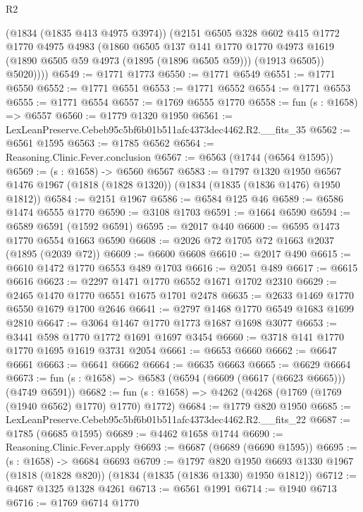 \begin{lexlean}{R2}
\begin{coremodule}
          (@1834 (@1835 @413 @4975 @3974))
          (@2151
            @6505
            @328
            @602
            @415
            @1772
            @1770
            @4975
            @4983
            (@1860
              @6505
              @137
              @141
              @1770
              @1770
              @4973
              @1619
              (@1890 @6505 @59 @4973 (@1895 (@1896 @6505 @59)))
              (@1913 @6505))
            @5020))))
@6549 := @1771 @1773
@6550 := @1771 @6549
@6551 := @1771 @6550
@6552 := @1771 @6551
@6553 := @1771 @6552
@6554 := @1771 @6553
@6555 := @1771 @6554
@6557 := @1769 @6555 @1770
@6558 := fun (s : @1658) => @6557
@6560 := @1779 @1320 @1950
@6561 := LexLeanPreserve.Cebeb95c5bf6b01b511afc4373dec4462.R2.__fits_35
@6562 := @6561 @1595
@6563 := @1785 @6562
@6564 := Reasoning.Clinic.Fever.conclusion
@6567 := @6563 (@1744 (@6564 @1595))
@6569 := (s : @1658) -> @6560 @6567
@6583 := @1797
    @1320
    @1950
    @6567
    @1476
    @1967
    (@1818 (@1828 @1320))
    (@1834 (@1835 (@1836 @1476) @1950 @1812))
@6584 := @2151 @1967
@6586 := @6584 @125 @46
@6589 := @6586 @1474 @6555 @1770
@6590 := @3108 @1703
@6591 := @1664 @6590
@6594 := @6589 @6591 (@1592 @6591)
@6595 := @2017 @440
@6600 := @6595 @1473 @1770 @6554 @1663 @6590
@6608 := @2026 @72 @1705 @72 @1663 @2037 (@1895 (@2039 @72))
@6609 := @6600 @6608
@6610 := @2017 @490
@6615 := @6610 @1472 @1770 @6553 @489 @1703
@6616 := @2051 @489
@6617 := @6615 @6616
@6623 := @2297 @1471 @1770 @6552 @1671 @1702 @2310
@6629 := @2465 @1470 @1770 @6551 @1675 @1701 @2478
@6635 := @2633 @1469 @1770 @6550 @1679 @1700 @2646
@6641 := @2797 @1468 @1770 @6549 @1683 @1699 @2810
@6647 := @3064 @1467 @1770 @1773 @1687 @1698 @3077
@6653 := @3441 @598 @1770 @1772 @1691 @1697 @3454
@6660 := @3718 @141 @1770 @1770 @1695 @1619 @3731 @2054
@6661 := @6653 @6660
@6662 := @6647 @6661
@6663 := @6641 @6662
@6664 := @6635 @6663
@6665 := @6629 @6664
@6673 := fun (s : @1658) => @6583 (@6594 (@6609 (@6617 (@6623 @6665))) (@4749 @6591))
@6682 := fun (s : @1658) => @4262 (@4268 (@1769 (@1769 (@1940 @6562) @1770) @1770) @1772)
@6684 := @1779 @820 @1950
@6685 := LexLeanPreserve.Cebeb95c5bf6b01b511afc4373dec4462.R2.__fits_22
@6687 := @1785 (@6685 @1595)
@6689 := @4462 @1658 @1744
@6690 := Reasoning.Clinic.Fever.apply
@6693 := @6687 (@6689 (@6690 @1595))
@6695 := (s : @1658) -> @6684 @6693
@6709 := @1797
    @820
    @1950
    @6693
    @1330
    @1967
    (@1818 (@1828 @820))
    (@1834 (@1835 (@1836 @1330) @1950 @1812))
@6712 := @4687 @1325 @1328 @4261
@6713 := @6561 @1991
@6714 := @1940 @6713
@6716 := @1769 @6714 @1770

\end{coremodule}
\end{lexlean}

